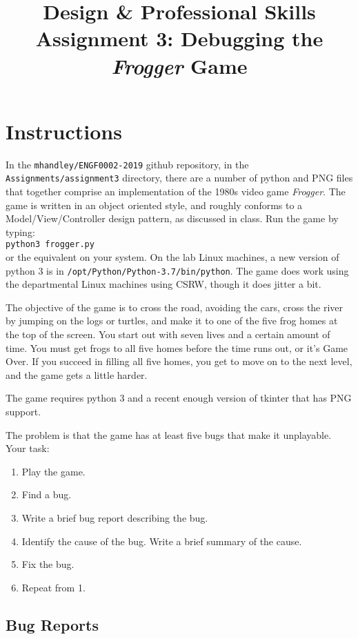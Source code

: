 \documentclass{article}
\title{Design \& Professional Skills\\
  Assignment 3: Debugging the {\em Frogger} Game}
\author{}
\date{}
\begin{document}
\maketitle

\section*{Instructions}

In the {\tt mhandley/ENGF0002-2019} github repository, in the \\
{\tt Assignments/assignment3} directory, there are a number of python and
PNG files that together comprise an implementation of the 1980s video
game \textit{Frogger}.  The game is written in an object oriented
style, and roughly conforms to a Model/View/Controller design pattern,
as discussed in class.  Run the game by typing:\\ \texttt{python3
  frogger.py}\\ or the equivalent on your system.  On the lab
Linux machines, a new version of python 3 is in
\texttt{/opt/Python/Python-3.7/bin/python}.  The game does work using
the departmental Linux machines using CSRW, though it does jitter a
bit.


The objective of the game is to cross the road, avoiding the cars,
cross the river by jumping on the logs or turtles, and make it to one
of the five frog homes at the top of the screen.  You start out with
seven lives and a certain amount of time.  You must get frogs to all
five homes before the time runs out, or it's Game Over.  If you
succeed in filling all five homes, you get to move on to the next
level, and the game gets a little harder.

The game requires python 3 and a recent enough version of tkinter that has PNG support.

The problem is that the game has at least five bugs that make it unplayable.  Your task:
\begin{enumerate}
\item Play the game.
\item Find a bug.
\item Write a brief bug report describing the bug.
\item Identify the cause of the bug.  Write a brief summary of the cause.
\item Fix the bug.
\item Repeat from 1.
\end{enumerate}

\subsection*{Bug Reports}
\end{document}
